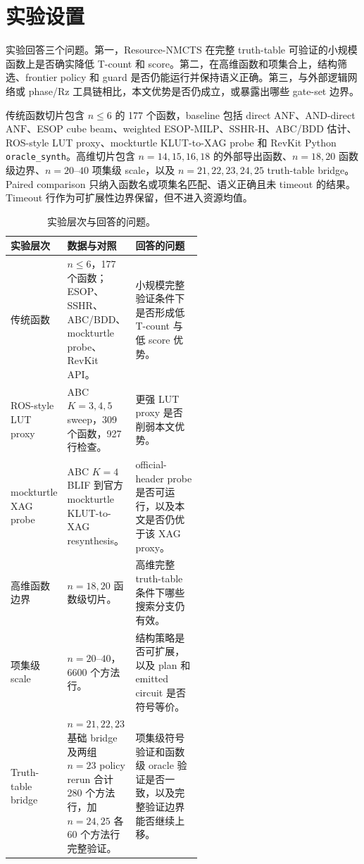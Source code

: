\documentclass[UTF8,fontset=macnew,11pt]{ctexart}
\newcommand{\method}{Resource-NMCTS}
\newcommand{\anf}{\ensuremath{\mathrm{ANF}}}
\begin{document}
\section{实验设置}

实验回答三个问题。第一，\method{} 在完整 truth-table 可验证的小规模函数上是否确实降低 T-count 和 score。第二，在高维函数和项集合上，结构筛选、frontier policy 和 guard 是否仍能运行并保持语义正确。第三，与外部逻辑网络或 phase/Rz 工具链相比，本文优势是否仍成立，或暴露出哪些 gate-set 边界。

传统函数切片包含 $n\leq6$ 的 177 个函数，baseline 包括 direct \anf{}、AND-direct \anf{}、ESOP cube beam、weighted ESOP-MILP、SSHR-H、ABC/BDD 估计、ROS-style LUT proxy、mockturtle KLUT-to-XAG probe 和 RevKit Python \texttt{oracle\_synth}。高维切片包含 $n=14,15,16,18$ 的外部导出函数、$n=18,20$ 函数级边界、$n=20$--$40$ 项集级 scale，以及 $n=21,22,23,24,25$ truth-table bridge。Paired comparison 只纳入函数名或项集名匹配、语义正确且未 timeout 的结果。Timeout 行作为可扩展性边界保留，但不进入资源均值。

\begin{table}[H]
\centering
\scriptsize
\caption{实验层次与回答的问题。}
\label{tab:experiment-layers}
\begin{tabularx}{\linewidth}{>{\raggedright\arraybackslash}p{0.23\linewidth}>{\raggedright\arraybackslash}p{0.31\linewidth}>{\raggedright\arraybackslash}X}
\toprule
实验层次 & 数据与对照 & 回答的问题 \\
\midrule
传统函数 & $n\leq6$，177 个函数；ESOP、SSHR、ABC/BDD、mockturtle probe、RevKit API。 & 小规模完整验证条件下是否形成低 T-count 与低 score 优势。 \\
ROS-style LUT proxy & ABC $K=3,4,5$ sweep，309 个函数，927 行检查。 & 更强 LUT proxy 是否削弱本文优势。 \\
mockturtle XAG probe & ABC $K=4$ BLIF 到官方 mockturtle KLUT-to-XAG resynthesis。 & official-header probe 是否可运行，以及本文是否仍优于该 XAG proxy。 \\
高维函数边界 & $n=18,20$ 函数级切片。 & 高维完整 truth-table 条件下哪些搜索分支仍有效。 \\
项集级 scale & $n=20$--$40$，6600 个方法行。 & 结构策略是否可扩展，以及 plan 和 emitted circuit 是否符号等价。 \\
Truth-table bridge & $n=21,22,23$ 基础 bridge 及两组 $n=23$ policy rerun 合计 280 个方法行，加 $n=24,25$ 各 60 个方法行完整验证。 & 项集级符号验证和函数级 oracle 验证是否一致，以及完整验证边界能否继续上移。 \\
\bottomrule
\end{tabularx}
\end{table}
\end{document}
